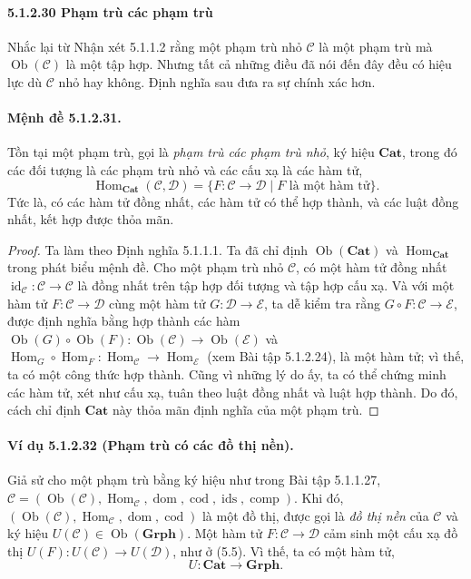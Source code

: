 \paragraph{5.1.2.30 Phạm trù các phạm trù}
Nhắc lại từ Nhận xét 5.1.1.2 rằng một phạm trù nhỏ $\mathcal C$ là một phạm trù mà $\operatorname{Ob}(\mathcal C)$ là một tập hợp. Nhưng tất cả những điều đã nói đến đây đều có hiệu lực dù $\mathcal C$ nhỏ hay không. Định nghĩa sau đưa ra
sự chính xác hơn.
\paragraph{Mệnh đề 5.1.2.31.} Tồn tại một phạm trù, gọi là \emph{phạm trù các phạm trù nhỏ}, ký hiệu $\mathbf{Cat}$, trong đó các đối tượng là các phạm trù nhỏ và các cấu xạ là các hàm tử,
\[\operatorname{Hom}_{\mathbf{Cat}}(\mathcal C,\mathcal D)=\{F:\mathcal C\to\mathcal D\mid F\text{ là một hàm tử}\}.\]
Tức là, có các hàm tử đồng nhất, các hàm tử có thể hợp thành, và các luật đồng nhất, kết hợp được thỏa mãn.
\begin{proof}
Ta làm theo Định nghĩa 5.1.1.1. Ta đã chỉ định $\operatorname{Ob}(\mathbf{Cat})$ và $\operatorname{Hom}_{\mathbf{Cat}}$ trong phát biểu mệnh đề. Cho một phạm trù nhỏ $\mathcal C$, có một hàm tử đồng nhất $\operatorname{id}_{\mathcal C}:\mathcal C\to\mathcal C$ là đồng nhất trên tập hợp đối tượng và tập hợp cấu xạ. Và với một hàm tử $F:\mathcal C\to\mathcal D$ cùng một hàm tử $G:\mathcal D\to\mathcal E$, ta dễ kiểm tra rằng $G\circ F:\mathcal C\to\mathcal E$, được định nghĩa bằng hợp thành các hàm $\operatorname{Ob}(G)\circ\operatorname{Ob}(F):\operatorname{Ob}(\mathcal C)\to\operatorname{Ob}(\mathcal E)$ và $\operatorname{Hom}_G\circ\operatorname{Hom}_F:\operatorname{Hom}_{\mathcal C}\to\operatorname{Hom}_{\mathcal E}$ (xem Bài tập 5.1.2.24), là một hàm tử; vì thế, ta có một công thức hợp thành. Cũng vì những lý do ấy, ta có thể chứng minh các hàm tử, xét như cấu xạ, tuân theo luật đồng nhất và luật hợp thành. Do đó, cách chỉ định $\mathbf{Cat}$ này thỏa mãn định nghĩa của một phạm trù.
\end{proof}
\paragraph{Ví dụ 5.1.2.32 (Phạm trù có các đồ thị nền).} Giả sử cho một phạm trù bằng ký hiệu như trong Bài tập 5.1.1.27, $\mathcal C=(\operatorname{Ob}(\mathcal C),\operatorname{Hom}_{\mathcal C},\operatorname{dom},\operatorname{cod},\operatorname{ids},\operatorname{comp})$. Khi đó, $(\operatorname{Ob}(\mathcal C),\operatorname{Hom}_{\mathcal C},\operatorname{dom},\operatorname{cod})$ là một đồ thị, được gọi là \emph{đồ thị nền} của $\mathcal C$ và ký hiệu $U(\mathcal C)\in\operatorname{Ob}(\mathbf{Grph})$. Một hàm tử $F:\mathcal C\to\mathcal D$ cảm sinh một cấu xạ đồ thị $U(F):U(\mathcal C)\to U(\mathcal D)$, như ở (5.5). Vì thế, ta có một hàm tử,
\[U:\mathbf{Cat}\longrightarrow\mathbf{Grph}.\]
